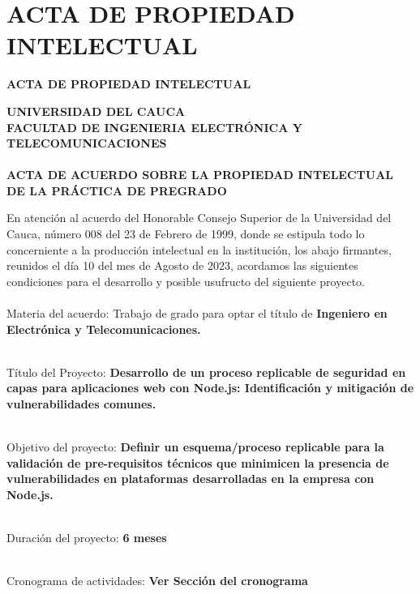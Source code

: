 
\section{ACTA DE PROPIEDAD INTELECTUAL}
\begin{center}
\vspace{0.7cm}
\textbf{{\Large ACTA DE PROPIEDAD INTELECTUAL}}

\end{center}
\begin{center}
    \textbf{UNIVERSIDAD DEL CAUCA}\\ 
    \textbf{FACULTAD DE INGENIERIA ELECTRÓNICA Y TELECOMUNICACIONES} \\ 
    \textbf{\\ACTA DE ACUERDO SOBRE LA PROPIEDAD INTELECTUAL DE LA PRÁCTICA DE PREGRADO }
\end{center}

En atención al acuerdo del Honorable Consejo Superior de la Universidad del Cauca, número 008 del 23 de Febrero de 1999, donde se estipula todo lo concerniente a la producción intelectual en la institución, los abajo firmantes, reunidos el día 10 del mes de Agosto de 2023, acordamos las siguientes condiciones para el desarrollo y posible usufructo del siguiente proyecto. \\ \\ 


Materia del acuerdo: Trabajo de grado para optar el título de \textbf{Ingeniero en Electrónica y Telecomunicaciones.\\ \\}

Título del Proyecto: \textbf{Desarrollo de un proceso replicable de seguridad en capas para aplicaciones web con Node.js: Identificación y mitigación de vulnerabilidades comunes.\\ \\} 

Objetivo del proyecto: \textbf{Definir un esquema/proceso replicable para la validación de pre-requisitos técnicos que minimicen la presencia de vulnerabilidades en plataformas desarrolladas en la empresa con Node.js. \\ \\}

Duración del proyecto: \textbf{6 meses \\ \\}

Cronograma de actividades: \textbf{Ver Sección del cronograma} \\ \\

